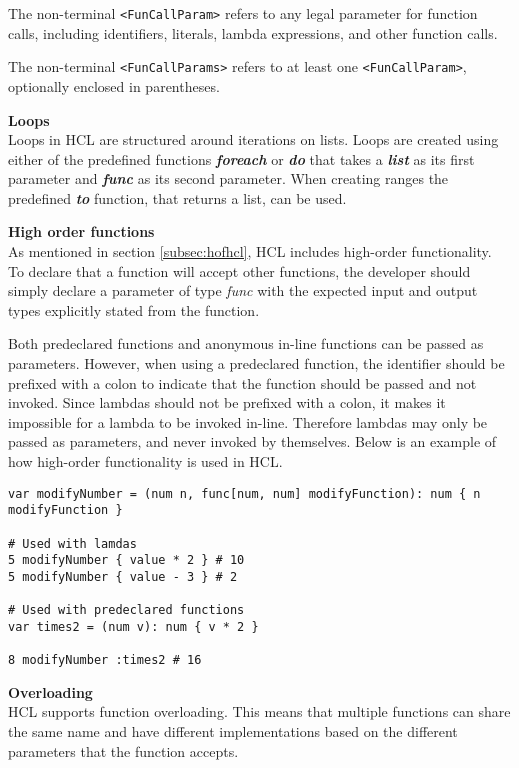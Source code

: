 The non-terminal \texttt{<FunCallParam>} refers to any legal parameter for function calls, including identifiers, literals, lambda expressions, and other function calls.

The non-terminal \texttt{<FunCallParams>} refers to at least one \texttt{<FunCallParam>}, optionally enclosed in parentheses.

\textbf{Loops}\\
Loops in HCL are structured around iterations on lists.
Loops are created using either of the predefined functions \textbf{\textit{foreach}} or \textbf{\textit{do}} that takes a \textbf{\textit{list}} as its first parameter and \textbf{\textit{func}} as its second parameter.
When creating ranges the predefined \textbf{\textit{to}} function, that returns a list, can be used. 

\textbf{High order functions}\\
As mentioned in section \ref{subsec:hofhcl}, HCL includes high-order functionality. 
To declare that a function will accept other functions, the developer should simply declare a parameter of type \textit{func} with the expected input and output types explicitly stated from the function.

Both predeclared functions and anonymous in-line functions can be passed as parameters. 
However, when using a predeclared function, the identifier should be prefixed with a colon to indicate that the function should be passed and not invoked. 
Since lambdas should not be prefixed with a colon, it makes it impossible for a lambda to be invoked in-line. 
Therefore lambdas may only be passed as parameters, and never invoked by themselves.
Below is an example of how high-order functionality is used in HCL.
\begin{lstlisting}[language=HCL,label=lis:hclTypeDcls,firstnumber=1]
var modifyNumber = (num n, func[num, num] modifyFunction): num { n modifyFunction }

# Used with lamdas
5 modifyNumber { value * 2 } # 10
5 modifyNumber { value - 3 } # 2

# Used with predeclared functions
var times2 = (num v): num { v * 2 }

8 modifyNumber :times2 # 16

\end{lstlisting}

\textbf{Overloading}\\
HCL supports function overloading. 
This means that multiple functions can share the same name and have different implementations based on the different parameters that the function accepts.

